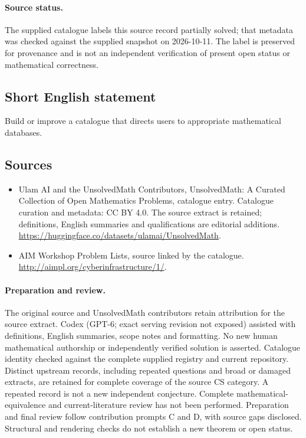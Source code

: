 \documentclass[11pt]{article}
\begin{document}
\paragraph{Source status.}
The supplied catalogue labels this source record partially solved; that metadata was checked against the supplied snapshot on 2026-10-11. The label is preserved for provenance and is not an independent verification of present open status or mathematical correctness.
\subsection{Short English statement}
Build or improve a catalogue that directs users to appropriate mathematical databases.
\subsection{Sources}
\begin{itemize}
\item[\hypertarget{source:statement:1}{S1}] Ulam AI and the UnsolvedMath Contributors, UnsolvedMath: A Curated Collection of Open Mathematics Problems, catalogue entry. Catalogue curation and metadata: CC BY 4.0. The source extract is retained; definitions, English summaries and qualifications are editorial additions.
\url{https://huggingface.co/datasets/ulamai/UnsolvedMath}.
\item[\hypertarget{source:statement:2}{S2}] AIM Workshop Problem Lists, source linked by the catalogue.
\url{http://aimpl.org/cyberinfrastructure/1/}.
\end{itemize}
\paragraph{Preparation and review.}
The original source and UnsolvedMath contributors retain attribution for the source extract. Codex (GPT-6; exact serving revision not exposed) assisted with definitions, English summaries, scope notes and formatting. No new human mathematical authorship or independently verified solution is asserted. Catalogue identity checked against the complete supplied registry and current repository. Distinct upstream records, including repeated questions and broad or damaged extracts, are retained for complete coverage of the source CS category. A repeated record is not a new independent conjecture. Complete mathematical-equivalence and current-literature review has not been performed. Preparation and final review follow contribution prompts C and D, with source gaps disclosed. Structural and rendering checks do not establish a new theorem or open status.
\label{end:statement}
\end{document}

